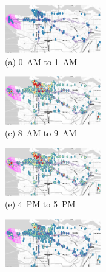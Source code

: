\begin{figure}[hhh!!]
\centering
   \begin{minipage}[b]{0.3\linewidth}
   \centering      
         \begin{minipage}[b]{\linewidth}
           \hspace*{-0.9cm}
           \centering
           \includegraphics[width=42mm]{modo_heatmaps/min/0.pdf}
           {\\(a) 0~AM to 1~AM}
         \end{minipage}
         \begin{minipage}[b]{\linewidth}
           \centering
           \hspace*{-0.9cm}
           \includegraphics[width=42mm]{modo_heatmaps/min/8.pdf}
           {\\(c) 8~AM to 9~AM}
         \end{minipage}
         \begin{minipage}[b]{\linewidth}
           \centering
           \hspace*{-0.9cm}
           \includegraphics[width=42mm]{modo_heatmaps/min/16.pdf}
           {\\(e) 4~PM to 5~PM}
         \end{minipage}
   \end{minipage}
   \hspace{3mm}
   \begin{minipage}[b]{0.3\linewidth}
   \centering
         \begin{minipage}[b]{\linewidth}
           \centering
           \hspace*{-0.1cm}
           \includegraphics[width=42mm]{modo_heatmaps/min/4.pdf}

\end{minipage}
\end{minipage}
\end{figure}
